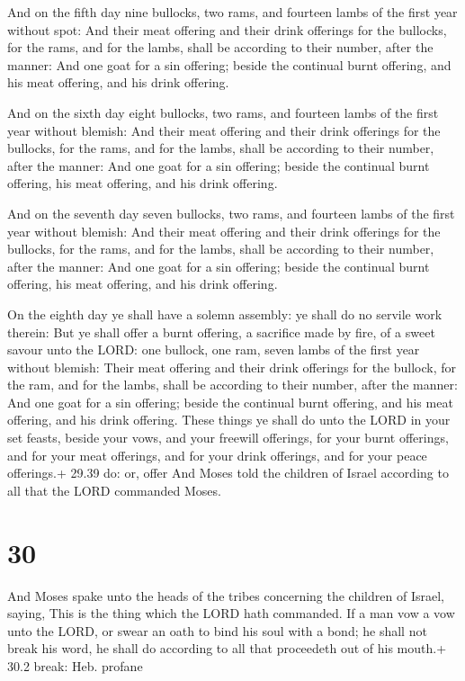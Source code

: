  And on the fifth day nine bullocks, two rams, and
fourteen lambs of the first year without spot:  And their
meat offering and their drink offerings for the bullocks, for the rams,
and for the lambs, shall be according to their number, after the manner:
 And one goat for a sin offering; beside the continual
burnt offering, and his meat offering, and his drink offering.

 And on the sixth day eight bullocks, two rams, and
fourteen lambs of the first year without blemish:  And
their meat offering and their drink offerings for the bullocks, for the
rams, and for the lambs, shall be according to their number, after the
manner:  And one goat for a sin offering; beside the
continual burnt offering, his meat offering, and his drink offering.

 And on the seventh day seven bullocks, two rams, and
fourteen lambs of the first year without blemish:  And
their meat offering and their drink offerings for the bullocks, for the
rams, and for the lambs, shall be according to their number, after the
manner:  And one goat for a sin offering; beside the
continual burnt offering, his meat offering, and his drink offering.

 On the eighth day ye shall have a solemn assembly: ye
shall do no servile work therein:  But ye shall offer a
burnt offering, a sacrifice made by fire, of a sweet savour unto the
LORD: one bullock, one ram, seven lambs of the first year without
blemish:  Their meat offering and their drink offerings for
the bullock, for the ram, and for the lambs, shall be according to their
number, after the manner:  And one goat for a sin offering;
beside the continual burnt offering, and his meat offering, and his
drink offering.  These things ye shall do unto the LORD in
your set feasts, beside your vows, and your freewill offerings, for your
burnt offerings, and for your meat offerings, and for your drink
offerings, and for your peace offerings.+ 29.39 do: or, offer
 And Moses told the children of Israel according to all
that the LORD commanded Moses.

\hypertarget{section-29}{%
\section{30}\label{section-29}}

 And Moses spake unto the heads of the tribes concerning the
children of Israel, saying, This is the thing which the LORD hath
commanded.  If a man vow a vow unto the LORD, or swear an
oath to bind his soul with a bond; he shall not break his word, he shall
do according to all that proceedeth out of his mouth.+ 30.2 break: Heb.
profane

